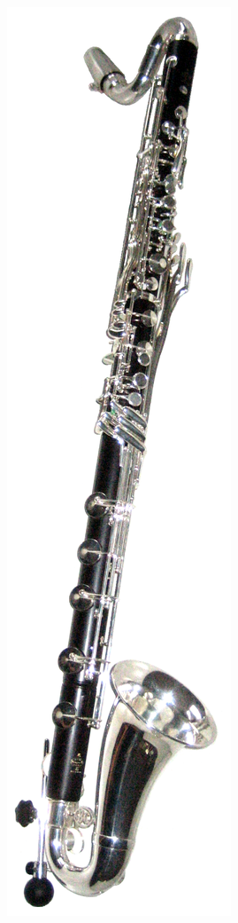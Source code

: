 \documentclass[a4paper,twoside]{article}
\begin{document}
\begin{titlepage}
{{\begin{center}
    \includegraphics[scale=0.5]{inc/MaBasseBuffetUt_transp}
    
    \vspace*{0pt plus 0.5 fill}


\end{center}}}
\end{titlepage}
\end{document}
